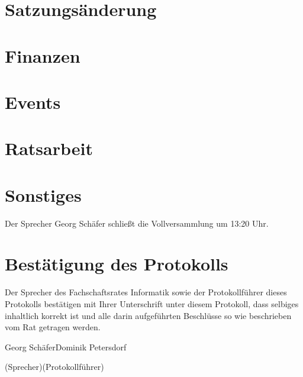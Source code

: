 \documentclass[a4paper, 11pt]{article} %
\newcommand{\TeXer}{Dominik Petersdorf}
\newcommand{\fsiPresident}{Georg Schäfer}
\begin{document}
\section{Satzungsänderung}
\section{Finanzen}
\section{Events}
\section{Ratsarbeit}
\section{Sonstiges}

Der Sprecher Georg Schäfer schließt die Vollversammlung um 13:20 Uhr.

\pagebreak
\section{Bestätigung des Protokolls}
Der Sprecher des Fachschaftsrates Informatik sowie der Protokollführer dieses Protokolls bestätigen mit Ihrer Unterschrift unter diesem Protokoll, dass selbiges inhaltlich korrekt ist und alle darin aufgeführten Beschlüsse so wie beschrieben vom Rat getragen werden.
\\
\vspace{1.5cm}


\vspace{3.5cm}
\hrulefill \hfill \hrulefill

\fsiPresident \hfill \TeXer

{\footnotesize (Sprecher)\hfill (Protokollführer)}
\end{document}
